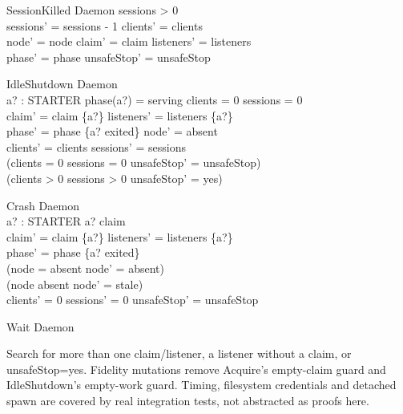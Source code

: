 \documentclass[a4paper,10pt]{article}
\begin{document}
\begin{schema}{SessionKilled}
\Delta Daemon
\where
sessions > 0 \\
sessions' = sessions - 1 \land clients' = clients \\
node' = node \land claim' = claim \land listeners' = listeners \\
phase' = phase \land unsafeStop' = unsafeStop
\end{schema}
\begin{schema}{IdleShutdown}
\Delta Daemon \\
a? : STARTER
\where
phase(a?) = serving \land clients = 0 \land sessions = 0 \\
claim' = claim \setminus \{a?\} \land listeners' = listeners \setminus \{a?\} \\
phase' = phase \oplus \{a? \mapsto exited\} \land node' = absent \\
clients' = clients \land sessions' = sessions \\
(clients = 0 \land sessions = 0 \implies unsafeStop' = unsafeStop) \\
(clients > 0 \lor sessions > 0 \implies unsafeStop' = yes)
\end{schema}
\begin{schema}{Crash}
\Delta Daemon \\
a? : STARTER
\where
a? \in claim \\
claim' = claim \setminus \{a?\} \land listeners' = listeners \setminus \{a?\} \\
phase' = phase \oplus \{a? \mapsto exited\} \\
(node = absent \implies node' = absent) \\
(node \neq absent \implies node' = stale) \\
clients' = 0 \land sessions' = 0 \land unsafeStop' = unsafeStop
\end{schema}
\begin{schema}{Wait}
\Xi Daemon
\end{schema}

Search for more than one claim/listener, a listener without a claim, or
unsafeStop=yes. Fidelity mutations remove Acquire's empty-claim guard and
IdleShutdown's empty-work guard. Timing, filesystem credentials and detached
spawn are covered by real integration tests, not abstracted as proofs here.
\end{document}
